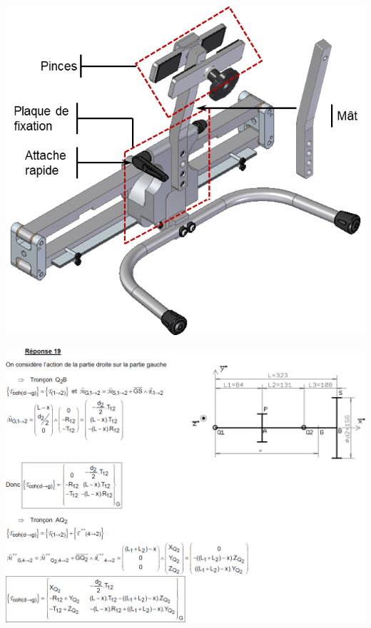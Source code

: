 \documentclass[10pt,fleqn]{article} %
\begin{document}
\begin{center}
\includegraphics[width=\linewidth]{images/fig_02}
\end{center}

\newpage
\begin{center}
\includegraphics[width=\linewidth]{images/cor_01}
\end{center}
\end{document}
